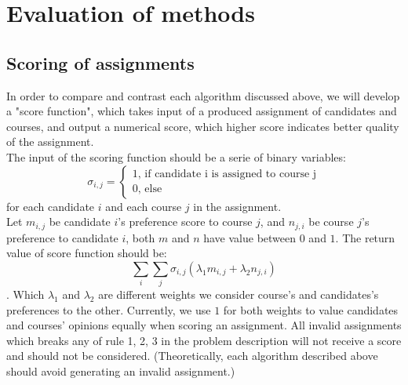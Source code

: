 \documentclass[twoside,twocolumn]{article}
\begin{document}
    \section{Evaluation of methods}
    \subsection{Scoring of assignments}
    In order to compare and contrast each algorithm discussed above, we will develop a "score function", which takes input
    of a produced assignment of candidates and courses, and output a numerical score, which higher score indicates better
    quality of the assignment.\\
    The input of the scoring function should be a serie of binary variables:
    $$\sigma_{i,j}=\begin{cases}1\text{, if candidate i is assigned to course j} \\
    0\text{, else}\end{cases}$$
    for each candidate $i$ and each course $j$ in the assignment.\\
    Let $m_{i, j}$ be candidate $i$'s preference score to course $j$, and $n_{j, i}$ be course $j$'s preference to candidate $i$,
    both $m$ and $n$ have value between $0$ and $1$. The return value of score function should be:
    $$\sum_i\sum_j \sigma_{i,j}(\lambda_1m_{i,j} + \lambda_2n_{j,i})$$.
    Which $\lambda_1$ and $\lambda_2$ are different weights we consider course's and candidates's preferences to the other. Currently,
    we use $1$ for both weights to value candidates and courses' opinions equally when scoring an assignment.
    All invalid assignments which breaks any of rule 1, 2, 3 in the problem description will not receive a score and should not be
    considered. (Theoretically, each algorithm described above should avoid generating an invalid assignment.)
\end{document}
